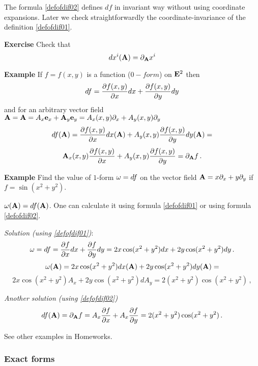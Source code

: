 \documentclass[12pt]{article}
\numberwithin{equation}{section}
\begin{document}
\m


  {\footnotesize  The formula \eqref{defofdif02} defines $df$ in invariant way without using coordinate
  expansions. Later we  check straightforwardly the coordinate-invariance of the  definition \eqref{defofdif01}. }



{\bf Exercise} Check that
                             \begin{equation}\label{fordifferential1}
     dx^i({\bf A})=\partial_{\bf A} x^i
\end{equation}

\m

{\bf Example} If $f=f(x,y)$ is a function ($0-form$) on ${\bf E}^2$ then
            $$
            df={\partial f(x,y)\over \partial x}dx+{\partial f(x,y)\over\partial y}dy
            $$
and for an arbitrary vector field
 ${\bf A}={\bf A}=A_x{\bf e}_x+{\bf A}_y{\bf e}_y=A_x(x,y)\partial_x+A_y(x,y)\partial_y$
                    $$
            df({\bf A})={\partial f(x,y)\over  \partial x}dx({\bf A})+
            A_y(x,y){\partial f(x,y)\over  \partial y}dy({\bf A})=
                     $$
                     $$
            {\bf A}_x(x,y){\partial f(x,y)\over  \partial x}+
            A_y(x,y){\partial f(x,y)\over  \partial y}=\partial_{\bf A} f\,.
                  $$


\m

{\bf Example}  Find the value of $1$-form ${\omega}=df$ on the vector field ${\bf A}=x\partial_x+y\partial_y$
if $f=\sin (x^2+y^2)$.

${\omega}({\bf A})=df({\bf A})$.
 One can calculate it using formula \eqref{defofdif01} or using formula  \eqref{defofdif02}.

{\it Solution (using \eqref{defofdif01})}:
               $$
               {\omega}=df={\partial f\over\partial x}dx+{\partial f\over\partial y}dy=2x\cos (x^2+y^2)dx+2y\cos (x^2+y^2)dy\,.
                $$
                   $${\omega}({\bf A})=2x\cos (x^2+y^2)dx({\bf A})+2y\cos (x^2+y^2)dy({\bf A})=
                    $$
                    $$
                   2x\cos (x^2+y^2)A_x+2y\cos (x^2+y^2)dA_y=2(x^2+y^2)\cos(x^2+y^2)\,,
                   $$

{\it Another solution (using \eqref{defofdif02})}
                 $$
df({\bf A})=\partial_{\bf A} f=A_x{\partial f\over\partial x}+A_x{\partial f\over\partial y}=2(x^2+y^2)\cos(x^2+y^2)\,.
                 $$

 See other examples in Homeworks.

\subsubsection {Exact forms}\label{exactform}
\end{document}

